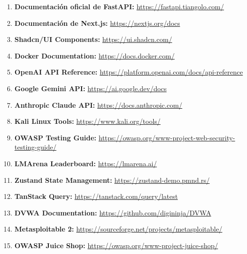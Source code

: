 \documentclass[12pt,a4paper]{article}
\begin{document}
\begin{enumerate}
    \item \textbf{Documentación oficial de FastAPI:} \url{https://fastapi.tiangolo.com/}
    
    \item \textbf{Documentación de Next.js:} \url{https://nextjs.org/docs}
    
    \item \textbf{Shadcn/UI Components:} \url{https://ui.shadcn.com/}
    
    \item \textbf{Docker Documentation:} \url{https://docs.docker.com/}
    
    \item \textbf{OpenAI API Reference:} \url{https://platform.openai.com/docs/api-reference}
    
    \item \textbf{Google Gemini API:} \url{https://ai.google.dev/docs}
    
    \item \textbf{Anthropic Claude API:} \url{https://docs.anthropic.com/}
    
    \item \textbf{Kali Linux Tools:} \url{https://www.kali.org/tools/}
    
    \item \textbf{OWASP Testing Guide:} \url{https://owasp.org/www-project-web-security-testing-guide/}
    
    \item \textbf{LMArena Leaderboard:} \url{https://lmarena.ai/}
    
    \item \textbf{Zustand State Management:} \url{https://zustand-demo.pmnd.rs/}
    
    \item \textbf{TanStack Query:} \url{https://tanstack.com/query/latest}
    
    \item \textbf{DVWA Documentation:} \url{https://github.com/digininja/DVWA}
    
    \item \textbf{Metasploitable 2:} \url{https://sourceforge.net/projects/metasploitable/}
    
    \item \textbf{OWASP Juice Shop:} \url{https://owasp.org/www-project-juice-shop/}
\end{enumerate}

\newpage
\end{document}
